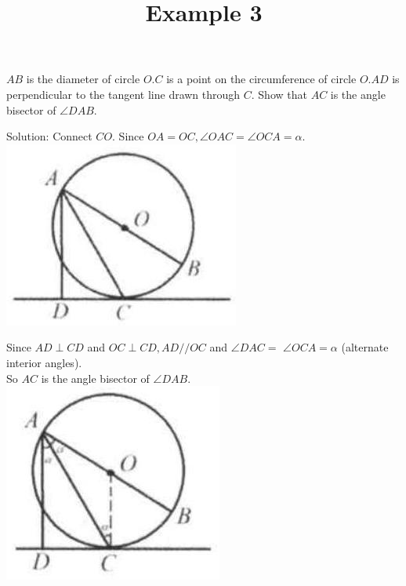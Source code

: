 \documentclass{article}
\title{Example 3}
\date{}
\begin{document}
\maketitle

\(A B\) is the diameter of circle \(O . C\) is a point on the circumference of circle \(O . A D\) is perpendicular to the tangent line drawn through \(C\). Show that \(A C\) is the angle bisector of \(\angle D A B\).

Solution:
Connect \(C O\). Since \(O A=O C, \angle O A C=\angle O C A=\alpha\).\\
\centering
\includegraphics[width=\textwidth]{images/problem_image_1.jpg}

Since \(A D \perp C D\) and \(O C \perp C D, A D / / O C\) and \(\angle D A C=\) \(\angle O C A=\alpha\) (alternate interior angles).\\
So \(A C\) is the angle bisector of \(\angle D A B\).\\
\centering
\includegraphics[width=\textwidth]{images/reasoning_image_1.jpg}
\end{document}
